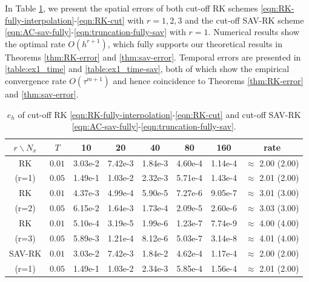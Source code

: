 In Table \ref{table:ex1_space}, we present the spatial errors of both
cut-off RK schemes \eqref{eqn:RK-fully-interpolation}-\eqref{eqn:RK-cut} with $r=1,2,3$ and the cut-off SAV-RK scheme
\eqref{eqn:AC-sav-fully}-\eqref{eqn:truncation-fully-sav}  with $r=1$.
Numerical results show the optimal rate $O(h^{r+1})$, which fully supports our theoretical results in
Theorems \ref{thm:RK-error} and \ref{thm:sav-error}.
Temporal errors are presented in \ref{table:ex1_time} and \ref{table:ex1_time-sav},
both of which show the empirical convergence rate $O(\tau^{m+1})$
and hence coincidence to Theorems \ref{thm:RK-error} and \ref{thm:sav-error}.



\begin{table}[h]
\centering
\caption{$e_h$ of cut-off RK  \eqref{eqn:RK-fully-interpolation}-\eqref{eqn:RK-cut}  and cut-off SAV-RK
\eqref{eqn:AC-sav-fully}-\eqref{eqn:truncation-fully-sav}. }
\begin{tabular}{|c|c|ccccc|c|}
\hline
$r\backslash N_x$  & $T$   &10 &20 &40 &80 &160&   rate \\
\hline
RK   &   $0.01$& 3.03e-2& 7.42e-3& 1.84e-3& 4.60e-4& 1.14e-4& $\approx$ 2.00 (2.00)    \\
 (r=1)   &   $0.05$& 1.49e-1& 1.03e-2& 2.32e-3& 5.71e-4& 1.43e-4& $\approx$ 2.01 (2.00)    \\
\hline
RK  &   $0.01$& 4.37e-3& 4.99e-4& 5.90e-5& 7.27e-6& 9.05e-7& $\approx$ 3.01 (3.00)    \\
(r=2)    &   $0.05$& 6.15e-2& 1.64e-3& 1.73e-4& 2.09e-5& 2.60e-6& $\approx$ 3.03 (3.00)    \\
\hline
RK   &   $0.01$& 5.10e-4& 3.19e-5& 1.99e-6& 1.23e-7& 7.74e-9&$\approx$ 4.00 (4.00)   \\
 (r=3)   &   $0.05$& 5.89e-3& 1.21e-4& 8.12e-6& 5.03e-7& 3.14e-8&$\approx$ 4.01 (4.00)    \\
\hline
SAV-RK &$0.01$& 3.03e-2& 7.42e-3& 1.84e-2& 4.62e-4& 1.17e-4& $\approx$ 2.00 (2.00)\\
(r=1)  &$0.05$& 1.49e-1& 1.03e-2& 2.34e-3& 5.85e-4& 1.56e-4& $\approx$ 2.01 (2.00)\\
\hline
\end{tabular}
\label{table:ex1_space}
\end{table}




